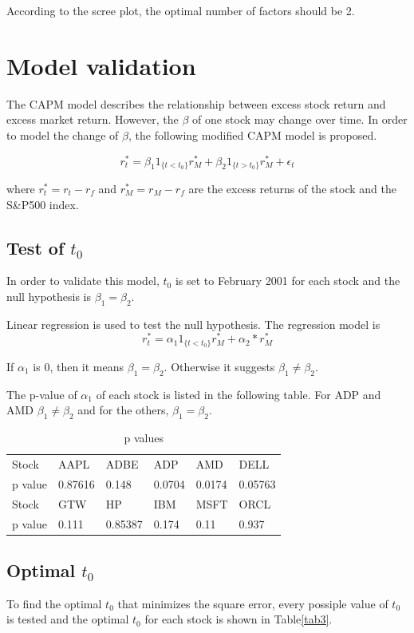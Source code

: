 \documentclass[10pt, conference]{IEEEtran}
\begin{document}
According to the scree plot, the optimal number of factors should be 2. 

\section{Model validation}
The CAPM model describes the relationship between excess stock return and excess market return. However, the $\beta$ of one stock may change over time. In order to model the change of $\beta$, the following modified CAPM model is proposed. 

$$ r_t^* = \beta_1 1 _{\{t<t_0\}} r_M^* + \beta_2 1_{\{t>t_0\}}r_M^* + \epsilon_t $$

where $r_t^* = r_t - r_f$ and $r_M^* = r_M - r_f$ are the excess returns of the stock and the S\&P500 index.

\subsection{Test of $t_0$}
In order to validate this model, $t_0$ is set to February 2001 for each stock and the null hypothesis is $\beta_1 = \beta_2$. 

Linear regression is used to test the null hypothesis. The regression model is $$ r_t^* = \alpha_1 1 _{\{t<t_0\}} r_M^* + \alpha_2 *r_M^* $$

If $\alpha_1$ is 0, then it means $\beta_1 = \beta_2$. Otherwise it suggests $\beta_1 \neq \beta_2$.

The p-value of $\alpha_1$ of each stock is listed in the following table. For ADP and AMD $\beta_1 \neq \beta_2$ and for the others, $\beta_1 = \beta_2$. 

\begin{table}[!h]
\centering
\caption{p values}
\label{tab2}
\begin{tabular}{llllll}
\hline
Stock   & AAPL    & ADBE    & ADP    & AMD    & DELL    \\
p value & 0.87616 & 0.148   & 0.0704 & 0.0174 & 0.05763 \\
\hline
Stock   & GTW     & HP      & IBM    & MSFT   & ORCL    \\
p value & 0.111   & 0.85387 & 0.174  & 0.11   & 0.937  \\
\hline
\end{tabular}
\end{table}

\subsection{Optimal $t_0$}
To find the optimal $t_0$ that minimizes the square error, every possiple value of $t_0$ is tested and the optimal $t_0$ for each stock is shown in Table\ref{tab3}. 
\end{document}
